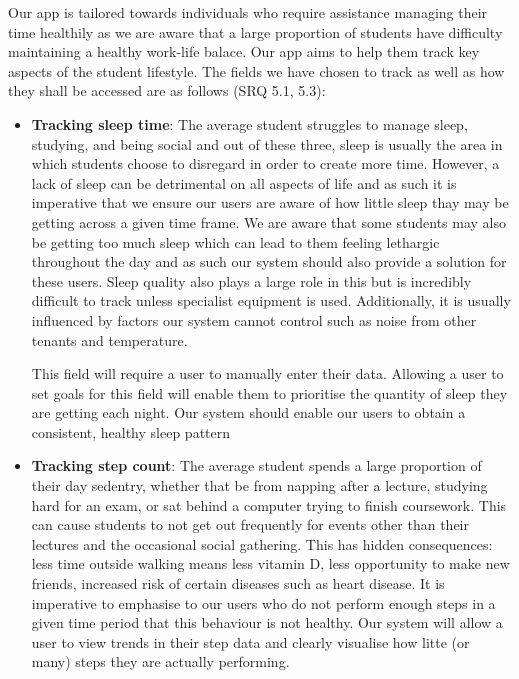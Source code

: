 \documentclass[12pt]{article}
\begin{document}
Our app is tailored towards individuals who require assistance managing their time healthily as
we are aware that a large proportion of students have difficulty maintaining a healthy work-life
balace. Our app aims to help them track key aspects of the student lifestyle.
The fields we have chosen to track as well as how they shall be accessed are as follows (SRQ 5.1, 5.3):

\begin{itemize}

    \item \textbf{Tracking sleep time}: The average student struggles to manage
        sleep, studying, and being social and out of these three, sleep is
        usually the area in which students choose to disregard in order to
        create more time. However, a lack of sleep can be detrimental on all
        aspects of life and as such it is imperative that we ensure our users
        are aware of how little sleep thay may be getting across a given time
        frame. We are aware that some students may also be getting too much
        sleep which can lead to them feeling lethargic throughout the day and
        as such our system should also provide a solution for these users.
        Sleep quality also plays a large role in this but is incredibly
        difficult to track unless specialist equipment is used. Additionally,
        it is usually influenced by factors our system cannot control such as
        noise from other tenants and temperature.

        This field will require a user to manually enter their data. 
        Allowing a user to set
        goals for this field will enable them to prioritise the quantity of
        sleep they are getting each night. Our system should enable our users
        to obtain a consistent, healthy sleep pattern
    
    \item \textbf{Tracking step count}: The average student spends a large
        proportion of their day sedentry, whether that be from napping after a
        lecture, studying hard for an exam, or sat behind a computer trying to
        finish coursework. This can cause students to not get out frequently
        for events other than their lectures and the occasional social
        gathering. This has hidden consequences: less time outside walking
        means less vitamin D, less opportunity to make new friends, increased
        risk of certain diseases such as heart disease. It is imperative to
        emphasise to our users who do not perform enough steps in a given time
        period that this behaviour is not healthy. Our system will allow a user
        to view trends in their step data and clearly visualise how litte (or
        many) steps they are actually performing.


\end{itemize}
\end{document}
